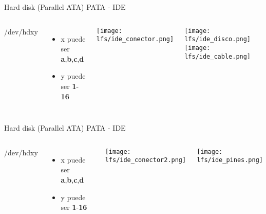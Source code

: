 \begin{frame}[c]{Hard disk (Parallel ATA) PATA - IDE}

  \begin{columns}
      {\huge /dev/hd{\color{red}x}{\color{blue}y}}
      \begin{itemize}
        \item {\color{red}x} puede ser \textbf{a},\textbf{b},\textbf{c},\textbf{d}
        \item {\color{blue}y} puede ser \textbf{1}-\textbf{16}
      \end{itemize}
      \begin{center}
        \texttt{[image: lfs/ide\_conector.png]}
      \end{center}
      \begin{center}
        \texttt{[image: lfs/ide\_disco.png]}
        \texttt{[image: lfs/ide\_cable.png]}
      \end{center}
  \end{columns}
\end{frame}

\begin{frame}[c]{Hard disk (Parallel ATA) PATA - IDE}

  \begin{columns}
      {\huge /dev/hd{\color{red}x}{\color{blue}y}}
      \begin{itemize}
        \item {\color{red}x} puede ser \textbf{a},\textbf{b},\textbf{c},\textbf{d}
        \item {\color{blue}y} puede ser \textbf{1}-\textbf{16}
      \end{itemize}
      \begin{center}
        \texttt{[image: lfs/ide\_conector2.png]}
      \end{center}
      \begin{center}
        \texttt{[image: lfs/ide\_pines.png]}
      \end{center}
  \end{columns}
\end{frame}

